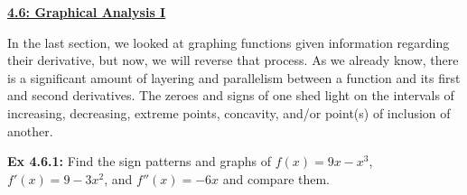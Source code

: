 \textbf{\underline{\large{4.6: Graphical Analysis I}}} \par

In the last section, we looked at graphing functions given information regarding their derivative, but now, we will reverse that process. As we already know, there is a significant amount of layering and parallelism between a function and its first and second derivatives. The zeroes and signs of one shed light on the intervals of increasing, decreasing, extreme points, concavity, and/or point(s) of inclusion of another. \par 

\begin{tcolorbox}[example]
    \textbf{Ex 4.6.1: } Find the sign patterns and graphs of $f(x) = 9x - x^3$, $f'(x) = 9 - 3x^2$, and $f''(x) = -6x$ and compare them. 
\end{tcolorbox}

